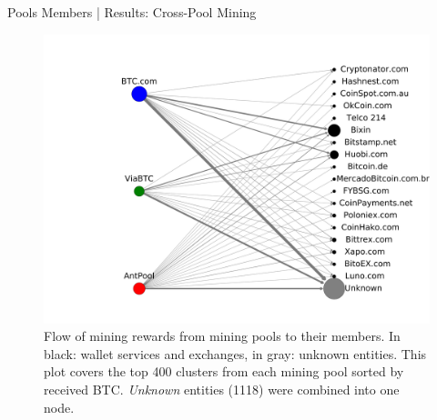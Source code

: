 \documentclass[10pt]{beamer}
\begin{document}
\begin{frame}[fragile]{Pools Members | Results: Cross-Pool Mining}
    \begin{figure}
        \includegraphics[width=0.7\columnwidth]{images/payments_graph_400.pdf}
        \caption{Flow of mining rewards from mining pools to their members. In black: wallet services and exchanges, in gray: unknown entities. This plot covers the top 400 clusters from each mining pool sorted by received BTC. \textit{Unknown} entities (1118) were combined into one node.}
        \label{fig:payment_graph}
    \end{figure}
\end{frame}
\end{document}
